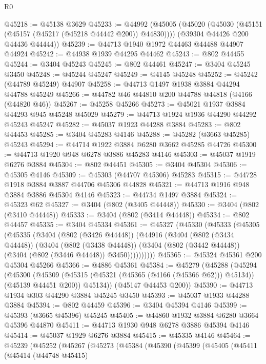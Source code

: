 \begin{lexlean}{R0}
\begin{coremodule}
@45218 := @45138 @3629
@45233 := @44992
    (@45005
      (@45020 (@45030 (@45151 (@45157 (@45217 (@45218 @44442 @200)) @44830))))
      (@39304 @44426 @200 @44436 @44444))
@45239 := @44713 @1940 @1972 @44463 @44488 @44907 @44924
@45242 := @44938 @1939 @44295 @44462
@45243 := @802 @44455
@45244 := @3404 @45243
@45245 := @802 @44461
@45247 := @3404 @45245 @3450
@45248 := @45244 @45247
@45249 := @4145 @45248
@45252 := @45242 (@44789 @45249) @44907
@45258 := @44713 @1497 @1938 @3884 @44294 @44788 @45249
@45266 := @44782 @46 @44810 @200 @44788 @44818 (@4166 (@44820 @46))
@45267 := @45258 @45266
@45273 := @45021 @1937 @3884 @44293 @945 @45248 @45029
@45279 := @44713 @1924 @1936 @44290 @44292 @45243 @45247
@45282 := @45037 @1923 @44288 @3884
@45283 := @802 @44453
@45285 := @3404 @45283 @4146
@45288 := @45282 (@3663 @45285) @45243
@45294 := @44714 @1922 @3884 @6280 @3662 @45285 @44726
@45300 := @44713 @1920 @948 @6278 @3886 @45283 @4146
@45303 := @45037 @1919 @6276 @3884
@45304 := @802 @44451
@45305 := @3404 @45304
@45306 := @45305 @4146
@45309 := @45303 (@44707 @45306) @45283
@45315 := @44728 @1918 @3884 @3887 @44706 @45306 @44828
@45321 := @44713 @1916 @948 @3884 @3886 @45304 @4146
@45323 := @44734 @1497 @3884
@45324 := @45323 @62
@45327 := @3404 (@802 (@3405 @44448))
@45330 := @3404 (@802 (@3410 @44448))
@45333 := @3404 (@802 (@3414 @44448))
@45334 := @802 @44457
@45335 := @3404 @45334
@45361 := @45327
    (@45330
      (@45333
        (@45305
          (@45335
            (@3404
              (@802 (@3426 @44448))
              (@44916
                (@3404
                  (@802 (@3434 @44448))
                  (@3404
                    (@802 (@3438 @44448))
                    (@3404 (@802 (@3442 @44448)) (@3404 (@802 (@3446 @44448)) @3450))))))))))
@45365 := @45324 @45361 @200 @45304 @45266
@45366 := @4886 @45361
@45384 := @45279
    (@45288
      (@45294
        (@45300
          (@45309 (@45315 (@45321 (@45365 (@4166 (@45366 @62))) @45134)) (@45139 @44451 @200))
          @45134))
      (@45147 @44453 @200))
@45390 := @44713 @1934 @303 @44290 @3884 @45245 @3450
@45393 := @45037 @1933 @44288 @3884
@45394 := @802 @44459
@45396 := @3404 @45394 @4146
@45399 := @45393 (@3665 @45396) @45245
@45405 := @44860 @1932 @3884 @6280 @3664 @45396 @44870
@45411 := @44713 @1930 @948 @6278 @3886 @45394 @4146
@45414 := @45037 @1929 @6276 @3884
@45415 := @45335 @4146
@45464 := @45239
    (@45252
      (@45267
        (@45273
          (@45384
            (@45390
              (@45399
                (@45405
                  (@45411
                    (@45414
                      (@44748 @45415)

\end{coremodule}
\end{lexlean}
